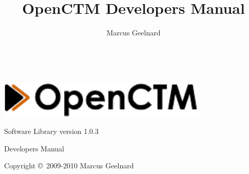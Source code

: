 %
%



\author{Marcus Geelnard}
\title{OpenCTM Developers Manual}





\begin{titlepage}
\begin{center}
~
\vspace{5cm}

\includegraphics[width=10.0cm]{logo.pdf}
\vspace{0.4cm}

{\large Software Library version 1.0.3}

\vspace{1.0cm}

{\Large Developers Manual}
\vspace{1.5cm}

Copyright \copyright \ 2009-2010 Marcus Geelnard
\end{center}
\end{titlepage}



